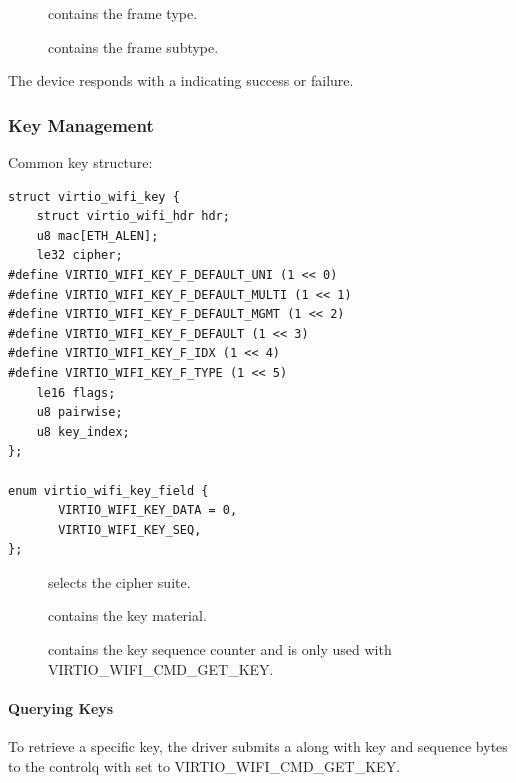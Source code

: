 \begin{description}
\item[] contains the frame type.
\item[] contains the frame subtype.
\end{description}

The device responds with a  indicating success or failure.

\subsubsection{Key Management}\label{sec:Device Types / 802.11 Device / Device Operation / Key Management}

Common key structure:

\begin{lstlisting}
struct virtio_wifi_key {
	struct virtio_wifi_hdr hdr;
	u8 mac[ETH_ALEN];
	le32 cipher;
#define VIRTIO_WIFI_KEY_F_DEFAULT_UNI (1 << 0)
#define VIRTIO_WIFI_KEY_F_DEFAULT_MULTI (1 << 1)
#define VIRTIO_WIFI_KEY_F_DEFAULT_MGMT (1 << 2)
#define VIRTIO_WIFI_KEY_F_DEFAULT (1 << 3)
#define VIRTIO_WIFI_KEY_F_IDX (1 << 4)
#define VIRTIO_WIFI_KEY_F_TYPE (1 << 5)
	le16 flags;
	u8 pairwise;
	u8 key_index;
};

enum virtio_wifi_key_field {
       VIRTIO_WIFI_KEY_DATA = 0,
       VIRTIO_WIFI_KEY_SEQ,
};
\end{lstlisting}

\begin{description}
\item[] %
\item[] selects the cipher suite.
\item[] contains the key material.
\item[] contains the key sequence counter and is only used with VIRTIO_WIFI_CMD_GET_KEY.
\end{description}

\paragraph{Querying Keys}\label{sec:Device Types / 802.11 Device / Device Operation / Key Management / Querying keys}

To retrieve a specific key, the driver submits a  along with key and sequence bytes to the controlq with  set to VIRTIO_WIFI_CMD_GET_KEY.

